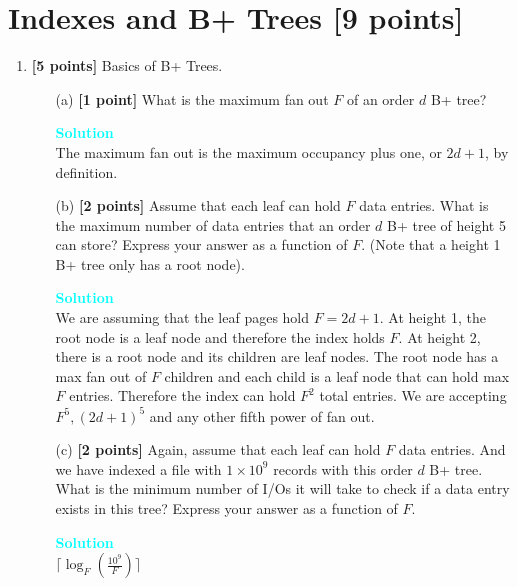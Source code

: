 \documentclass[10pt]{article}
\newenvironment{solution}
    { \begin{mdframed}[backgroundcolor=gray!10] \textcolor{cyan}{\textbf{Solution}} \\}
    {  \end{mdframed}}
\begin{document}
\newpage
\section{Indexes and B+ Trees \textbf{[9 points]}}

\begin{enumerate}

	\item \textbf{[5 points]} Basics of B+ Trees.
	      \begin{itemize}
		      \item[(a)] \textbf{[1 point]} What is the maximum fan out $F$ of an order $d$ B+ tree? %
		            \begin{solution}
			            The maximum fan out is the maximum occupancy plus one, or $2d + 1$, by definition.
		            \end{solution}

		      \item[(b)] \textbf{[2 points]}
		            Assume that each leaf can hold $F$ data entries. What is the maximum number of data entries
		            that an order $d$ B+ tree of height 5 can store? Express your answer as a function of $F$. (Note that a height 1 B+ tree only has a root node).
		            \begin{solution}
			            We are assuming that the leaf pages hold $F = 2d + 1$.
			            At height 1, the root node is a leaf node and therefore the index holds $F$. At height 2, there is a
			            root node and its children are leaf nodes. The root node has a max fan out of $F$ children and each
			            child is a leaf node that can hold max $F$ entries. Therefore the index can hold $F^2$ total entries. We are accepting $F^5, (2d + 1)^5$ and any other fifth power of fan out.
		            \end{solution}

		      \item[(c)] \textbf{[2 points]}
		            Again, assume that each leaf can hold $F$ data entries. And we have indexed a file with $1\times 10^9$ records with this
		            order $d$ B+ tree. What is the minimum number of I/Os it will take to check if a data entry exists in this tree?
		            Express your answer as a function of $F$.
		            \begin{solution}
			            $\lceil \log_F(\frac{10^9}{F})\rceil$
		            \end{solution}
	      \end{itemize}


\end{enumerate}
\end{document}
